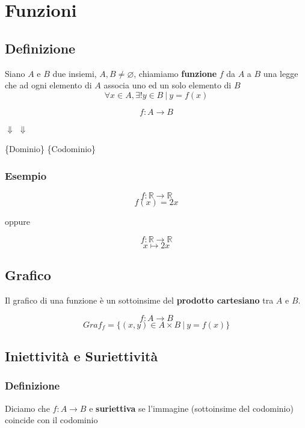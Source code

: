 \section{Funzioni}
\subsection{Definizione}
Siano $A$ e $B$ due insiemi, $A,B \neq \varnothing$, chiamiamo \textbf{funzione} $f$ da $A$ a $B$
una legge che ad ogni elemento di $A$ associa uno ed un solo elemento di $B$
\[
    \forall x \in A, \exists! y \in B\ |\ y = f(x)    
\]
\break \hfill
\begin{Large}
\[
    f: A \rightarrow B
\]
\end{Large}
\begin{center}
    \hspace{0.75cm}$\Downarrow$ \hspace{0.75cm} $\Downarrow$\\
    \begin{small}
    \qquad \quad \quad \{Dominio\} \{Codominio\}
    \end{small}
\end{center}
\subsubsection*{Esempio}
\begin{Large}
\[
    f: \mathbb{R} \rightarrow \mathbb{R}    
\]
\[
    f(x) = 2x    
\]
\end{Large}
oppure
\begin{Large}
\[
    f: \mathbb{R} \rightarrow \mathbb{R}
\]
\[
    x \mapsto 2x
\]
\end{Large}

\subsection{Grafico}
Il grafico di una funzione è un sottoinsime del \textbf{prodotto cartesiano} tra $A$ e $B$.
\begin{Large}
\[
    f:A \rightarrow B
\]
\[
    Graf_{f}= \{(x,y) \in A \times B\ |\ y=f(x)\}
\]
\end{Large}
\subsection{Iniettività e Suriettività}
\subsubsection*{Definizione}
Diciamo che $f:A\rightarrow B$ e \textbf{suriettiva} se l'immagine (sottoinsime del codominio) coincide
con il codominio


